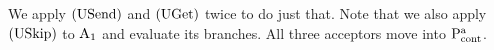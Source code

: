 We apply $\Usend$ and $\Uget$ twice to do just that.
Note that we also apply $\Uskip$ to $\Acceptor{1}$ and evaluate its branches.
All three acceptors move into $\PaCont$.



